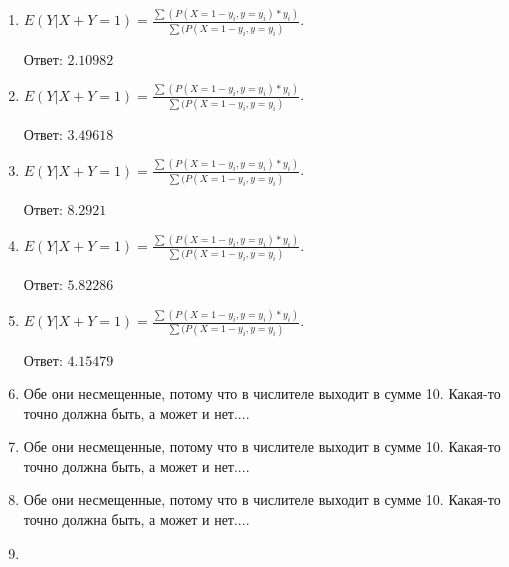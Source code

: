 \documentclass[a4paper,12pt]{article}
\begin{document}
\begin{enumerate}
\item

    
        $E(Y|X+Y=1) = \frac{\sum(P(X=1 - y_i, y=y_i) * y_i)}{\sum(P(X=1 - y_i, y=y_i)}$.

        Ответ: $2.10982$
    


\item

    
        $E(Y|X+Y=1) = \frac{\sum(P(X=1 - y_i, y=y_i) * y_i)}{\sum(P(X=1 - y_i, y=y_i)}$.

        Ответ: $3.49618$
    


\item

    
        $E(Y|X+Y=1) = \frac{\sum(P(X=1 - y_i, y=y_i) * y_i)}{\sum(P(X=1 - y_i, y=y_i)}$.

        Ответ: $8.2921$
    


\item

    
        $E(Y|X+Y=1) = \frac{\sum(P(X=1 - y_i, y=y_i) * y_i)}{\sum(P(X=1 - y_i, y=y_i)}$.

        Ответ: $5.82286$
    


\item

    
        $E(Y|X+Y=1) = \frac{\sum(P(X=1 - y_i, y=y_i) * y_i)}{\sum(P(X=1 - y_i, y=y_i)}$.

        Ответ: $4.15479$
    


\item


Обе они несмещенные, потому что в числителе выходит в сумме 10.
Какая-то точно должна быть, а может и нет....



\item


Обе они несмещенные, потому что в числителе выходит в сумме 10.
Какая-то точно должна быть, а может и нет....



\item


Обе они несмещенные, потому что в числителе выходит в сумме 10.
Какая-то точно должна быть, а может и нет....



\item



\end{enumerate}
\end{document}
